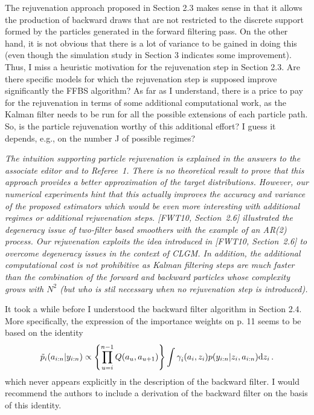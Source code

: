\vspace{.5cm}

\noindent The rejuvenation approach proposed in Section 2.3 makes sense in that it allows the
production of backward draws that are not restricted to the discrete support formed by the particles generated in the forward  filtering pass. On the other hand, it is not obvious that there is a lot of variance to be gained in doing this (even though the simulation study in Section 3 indicates some improvement). Thus, I miss a heuristic
motivation for the rejuvenation step in Section 2.3. Are there specific models for which the rejuvenation step is supposed improve significantly the FFBS algorithm? As far as I understand, there is a price to pay for the rejuvenation in terms of some additional computational work, as the Kalman filter needs to be run for all the possible extensions
of each particle path. So, is the particle rejuvenation worthy of this additional effort? I guess it depends, e.g., on the number J of possible regimes?

\vspace{.2cm}
{\em
\noindent The intuition supporting particle rejuvenation is explained in the answers to the associate editor and to Referee~1. There is no theoretical result to prove that this approach provides a better approximation of the target distributions. However, our numerical experiments hint that this actually improves the accuracy and variance of the proposed estimators which would be even more interesting with additional regimes or additional rejuvenation steps. 
[FWT10, Section~2.6] illustrated the degeneracy issue of two-filter based smoothers with the example of an AR(2) process. Our rejuvenation exploits the idea introduced in [FWT10, Section~2.6] to overcome degeneracy issues in the context of CLGM. In addition, the additional computational cost is not prohibitive as Kalman filtering steps are much faster than the combination of the forward and backward particles whose complexity grows with $N^2$ (but who is stil necessary when no rejuvenation step is introduced).
}

\vspace{.5cm}

\noindent It took a while before I understood the backward filter algorithm in Section 2.4. More
specifically, the expression of the importance weights on p. 11 seems to be based on
the identity
\[
\tilde{p}_{i}(a_{i:n}|y_{i:n}) \propto \left\{\prod_{u=i}^{n-1}Q(a_u,a_{u+1})\right\} \int \gamma^{}_{i}(a_i,z_i) p(y_{i:n}|z_i,a_{i:n})\mathrm{d} z_i\,.
\]
which never appears explicitly in the description of the backward  filter. I would recommend
the authors to include a derivation of the backward filter on the basis of this identity.

